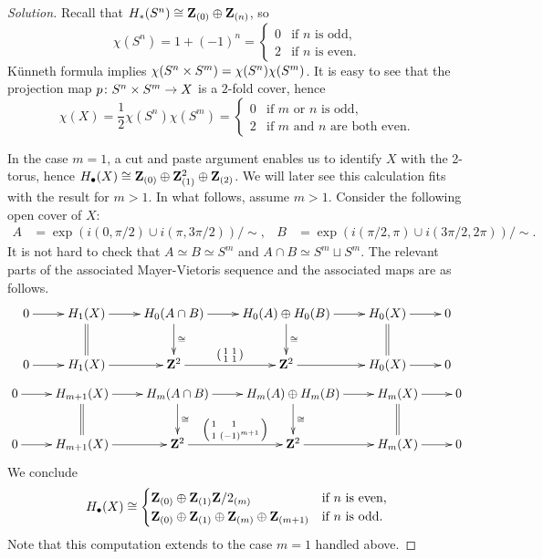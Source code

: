 \begin{proof}[Solution]
  Recall that $H_\ast(S^n) \cong \mathbf{Z}_{(0)} \oplus \mathbf{Z}_{(n)}$, so
  \[
  \chi(S^n) =
  1 + (-1)^n =
  \begin{cases}
    0 & \textrm{if $n$ is odd}, \\
    2 & \textrm{if $n$ is even}.
  \end{cases}
  \]
  K\"unneth formula implies $\chi(S^n \times S^m) = \chi(S^n) \chi(S^m)$. It is easy to see that the projection map $p \colon S^n \times S^m \rightarrow X$ is a $2$-fold cover, hence
  \[
  \chi(X) =
  \frac{1}{2} \chi(S^n)\chi(S^m) =
  \begin{cases}
    0 & \textrm{if $m$ or $n$ is odd}, \\
    2 & \textrm{if $m$ and $n$ are both even}.
  \end{cases}
  \]

  In the case $m = 1$, a cut and paste argument enables us to identify $X$ with the 2-torus, hence $H_\bullet(X) \cong \mathbf{Z}_{(0)} \oplus \mathbf{Z}_{(1)}^2 \oplus \mathbf{Z}_{(2)}$. We will later see this calculation fits with the result for $m > 1$. In what follows, assume $m > 1$. Consider the following open cover of $X$:
  \begin{align*}
    A &= \exp(i(0,\pi/2) \cup i(\pi,3\pi/2))/\!\!\sim, &
    B &= \exp(i(\pi/2,\pi) \cup i(3\pi/2,2\pi))/\!\!\sim.
  \end{align*}
  It is not hard to check that $A \simeq B \simeq S^m$ and $A \cap B \simeq S^m \sqcup S^m$. The relevant parts of the associated Mayer-Vietoris sequence and the associated maps are as follows.
  \[\xymatrix{
    0 \ar[r] & H_1(X) \ar[r] \ar@{=}[d] & H_0(A \cap B) \ar[r] \ar[d]^\cong & H_0(A) \oplus H_0(B) \ar[r] \ar[d]^\cong & H_0(X) \ar[r] \ar@{=}[d] & 0 \\
    0 \ar[r] & H_1(X) \ar[r] & \Z^2 \ar[r]^{\left(\begin{smallmatrix} 1 & 1 \\ 1 & 1 \end{smallmatrix}\right)} & \Z^2 \ar[r] & H_0(X) \ar[r] & 0 \\
  }\]
  \[\xymatrix{
    0 \ar[r] & H_{m+1}(X) \ar[r] \ar@{=}[d] & H_m(A \cap B) \ar[r] \ar[d]^\cong & H_m(A) \oplus H_m(B) \ar[r] \ar[d]^\cong & H_m(X) \ar[r] \ar@{=}[d] & 0 \\
    0 \ar[r] & H_{m+1}(X) \ar[r] & \Z^2 \ar[r]^{\left(\begin{smallmatrix} 1 & \phantom{(-}1\phantom{)^{m+1}} \\ 1 & (-1)^{m+1} \end{smallmatrix}\right)} & \Z^2 \ar[r] & H_m(X) \ar[r] & 0 \\
  }\]
  We conclude
  \[
  H_\bullet(X) \cong
  \begin{cases}
    \mathbf{Z}_{(0)} \oplus \mathbf{Z}_{(1)} \mathbf{Z}/2_{(m)} & \textnormal{if $n$ is even}, \\
    \mathbf{Z}_{(0)} \oplus \mathbf{Z}_{(1)} \oplus \mathbf{Z}_{(m)} \oplus \mathbf{Z}_{(m+1)} & \textnormal{if $n$ is odd}.
  \end{cases}
  \]
  Note that this computation extends to the case $m = 1$ handled above.
\end{proof}

